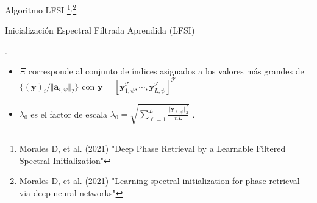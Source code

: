 \documentclass[aspectratio=169,t,xcolor=table]{beamer}
\begin{document}
\begin{frame}{Algoritmo LFSI \footnote{\tiny Morales D, et al. (2021) "Deep Phase Retrieval by a Learnable Filtered Spectral Initialization"}$^,$\footnote{\tiny Morales D, et al. (2021) "Learning spectral initialization for phase retrieval via deep neural networks"}}
\vspace{-0.6cm}
\scriptsize
\centering
\begin{algorithm}[H]
    \scriptsize
    \caption{Inicialización Espectral Filtrada Aprendida (LFSI)}\label{fsi_algo}
    \begin{algorithmic}[1]
		.		
		\EndFor
	\end{algorithmic}
    \label{alg_1}
\end{algorithm}
\vspace{-0.4cm}
\begin{itemize}
    \scriptsize
    \item $\Xi$ corresponde al conjunto de índices asignados a los valores más grandes de $\{(\mathbf{y})_i / \Vert \mathbf{a}_{i,\psi}\Vert_{2}\}$ con $\mathbf{y}=[\mathbf{y}_{1,\psi}^\mathcal{T},\cdots,\mathbf{y}_{L,\psi}^\mathcal{T}]^\mathcal{T}$
    \item $\lambda_0$ es el factor de escala $\lambda_0=\sqrt{\sum_{\ell=1}^{L}\frac{\Vert\mathbf{y}_{\ell,\psi}\Vert_{2}^2}{nL}}$ .
    \vfill
\end{itemize}

\end{frame}
\end{document}
